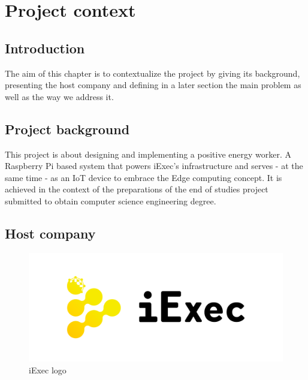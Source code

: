 
\chapter{Project context}

\section{Introduction}
  The aim of this chapter is to contextualize the project by giving its background,
  presenting the host company and defining in a later section the main problem as well
  as the way we address it.

\section{Project background}
  This project is about designing and implementing a positive energy worker.
  A Raspberry Pi based system that powers iExec's infrastructure and serves - at the same
  time - as an IoT device to embrace the Edge computing concept.
  It is achieved in the context of the preparations of the end of studies project submitted to
  obtain computer science engineering degree.

\section{Host company}

  \begin{figure}[!h]\centering
    \includegraphics[width=.5\columnwidth]{2-Context/figs/iExec-logo.pdf}
    \caption{iExec logo}
  \end{figure}

